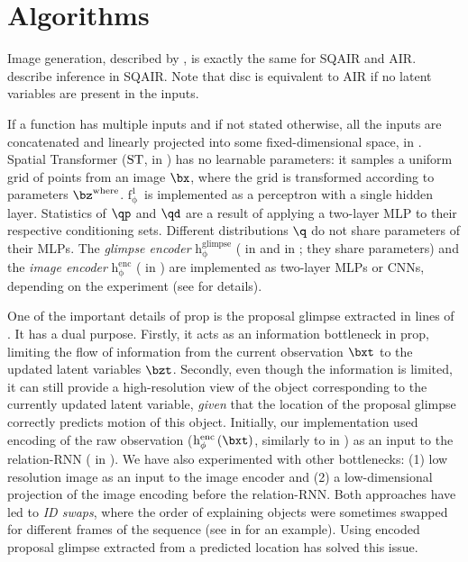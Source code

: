 \section{Algorithms}
\label{app:algo}

Image generation, described by , is exactly the same for \gls{SQAIR} and \gls{AIR}.
 describe inference in \gls{SQAIR}. Note that \gls{disc} is equivalent to \gls{AIR} if no latent variables are present in the inputs.

If a function has multiple inputs and if not stated otherwise, all the inputs are concatenated and linearly projected into some fixed-dimensional space,\eg{} in .
Spatial Transformer ($\operatorname{ST}$,\eg {} in ) has no learnable parameters: it samples a uniform grid of points from an image $\bx$, where the grid is transformed according to parameters $\bz^\mathrm{where}$.
$\operatorname{f_\phi^1}$~is implemented as a perceptron with a single hidden layer.
Statistics of $\qp$ and $\qd$ are a result of applying a two-layer \gls{MLP} to their respective conditioning sets.
Different distributions $\q$ do not share parameters of their \glspl{MLP}.
The \textit{glimpse encoder} $\operatorname{h_\phi^\mathrm{glimpse}}$ ( in  and  in ; they share parameters) and the \textit{image encoder} $\operatorname{h_\phi^\mathrm{enc}}$ ( in ) are implemented as two-layer \glspl{MLP} or \glspl{CNN}, depending on the experiment (see  for details).

One of the important details of \gls{prop} is the proposal glimpse extracted in lines  of . 
It has a dual purpose. 
Firstly, it acts as an information bottleneck in \gls{prop}, limiting the flow of information from the current observation $\bxt$ to the updated latent variables $\bzt$.
Secondly, even though the information is limited, it can still provide a high-resolution view of the object corresponding to the currently updated latent variable, \textit{given} that the location of the proposal glimpse correctly predicts motion of this object.
Initially, our implementation used encoding of the raw observation ($\operatorname{h_\phi^\mathrm{enc}} \left( \bxt \right)$, similarly to  in ) as an input to the relation-\gls{RNN} ( in ). We have also experimented with other bottlenecks: (1) low resolution image as an input to the image encoder and (2) a low-dimensional projection of the image encoding before the relation-\gls{RNN}. 
Both approaches have led to \textit{ID swaps}, where the order of explaining objects were sometimes swapped for different frames of the sequence (see  in  for an example). 
Using encoded proposal glimpse extracted from a predicted location has solved this issue.

